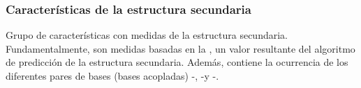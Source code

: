 %
%
\subsubsection{Características de la estructura secundaria}
%
Grupo de características con medidas de la estructura secundaria.
Fundamentalmente, son medidas basadas en la ,
un valor resultante del algoritmo de predicción de la estructura
secundaria.  Además, contiene la ocurrencia de los diferentes pares de
bases (bases acopladas) \ntA-\ntU, \ntG-\ntC y \ntG-\ntU.
